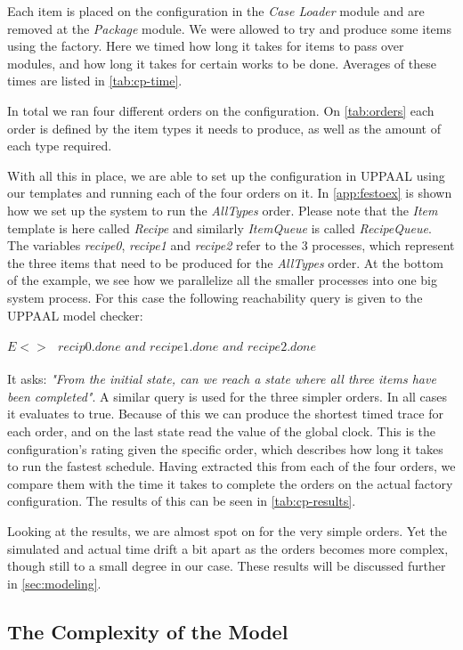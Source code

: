 Each item is placed on the configuration in the \textit{Case Loader} module and are removed at the \textit{Package} module. We were allowed to try and produce some items using the factory. Here we timed how long it takes for items to pass over modules, and how long it takes for certain works to be done. Averages of these times are listed in \cref{tab:cp-time}.



In total we ran four different orders on the configuration. On \cref{tab:orders} each order is defined by the item types it needs to produce, as well as the amount of each type required.   



With all this in place, we are able to set up the configuration in UPPAAL using our templates and running each of the four orders on it. In \cref{app:festoex} is shown how we set up the system to run the \textit{AllTypes} order. Please note that the \textit{Item} template is here called \textit{Recipe} and similarly \textit{ItemQueue} is called \textit{RecipeQueue}. The variables \textit{recipe0}, \textit{recipe1} and \textit{recipe2} refer to the 3 processes, which represent the three items that need to be produced for the \textit{AllTypes} order. At the bottom of the example, we see how we parallelize all the smaller processes into one big system process. For this case the following reachability query is given to the UPPAAL model checker:
\\ \\
$E<>\textit{ }recip0.done\textit{ and }recipe1.done\textit{ and }recipe2.done$
\\ \\
It asks: \textit{"From the initial state, can we reach a state where all three items have been completed"}. A similar query is used for the three simpler orders. In all cases it evaluates to true. Because of this we can produce the shortest timed trace for each order, and on the last state read the value of the global clock. This is the configuration's rating given the specific order, which describes how long it takes to run the fastest schedule. Having extracted this from each of the four orders, we compare them with the time it takes to complete the orders on the actual factory configuration. The results of this can be seen in \cref{tab:cp-results}.



Looking at the results, we are almost spot on for the very simple orders. Yet the simulated and actual time drift a bit apart as the orders becomes more complex, though still to a small degree in our case. These results will be discussed further in \cref{sec:modeling}.

\subsection{The Complexity of the Model}